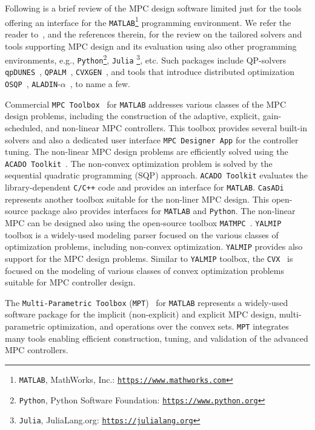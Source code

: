 \documentclass[letterpaper, 10 pt, conference]{ieeeconf}
\begin{document}
	Following is a brief review of the MPC design software limited just for the tools offering an interface for the \texttt{MATLAB}\footnote{\texttt{MATLAB}, MathWorks, Inc.: \texttt{\url{https://www.mathworks.com}}} programming environment. We refer the reader to~\cite{KF18,LT17,HS22}, 
	and the references therein, for the review on the tailored solvers and tools supporting MPC design and its evaluation using also other programming environments, e.g., \texttt{Python}\footnote{\texttt{Python}, Python Software Foundation: \texttt{\url{https://www.python.org}}}, \texttt{Julia} \footnote{\texttt{Julia}, JuliaLang.org: \texttt{\url{https://julialang.org}}}, etc. Such packages include QP-solvers \texttt{qpDUNES}~\cite{qpDUNES}, \texttt{QPALM}~\cite{QPALM}, \texttt{CVXGEN}~\cite{CVXGEN}, and tools that introduce distributed optimization \texttt{OSQP}~\cite{OSQP}, \texttt{ALADIN}-$\alpha$~\cite{EJ21}, to name a few. 
	
	Commercial \texttt{MPC Toolbox}~\cite{MPC_toolbox} for \texttt{MATLAB} addresses various classes of the MPC design problems, including the construction of the adaptive, explicit, gain-scheduled, and non-linear MPC controllers. This toolbox provides several built-in solvers and also a dedicated user interface \texttt{MPC Designer App} for the controller tuning. 
	The non-linear MPC design problems are efficiently solved using the \texttt{ACADO Toolkit}~\cite{ACADO_Toolkit}. The non-convex optimization problem is solved by the sequential quadratic programming (SQP) approach.  \texttt{ACADO Toolkit} evaluates the library-dependent \texttt{C/C++} code and provides an interface for \texttt{MATLAB}. 
	\texttt{CasADi}~\cite{CasADi} represents another toolbox suitable for the non-liner MPC design. This open-source package also provides interfaces for \texttt{MATLAB} and \texttt{Python}. 
	The non-linear MPC can be designed also using the open-source toolbox \texttt{MATMPC}~\cite{MATMPC}. 
	\texttt{YALMIP}~\cite{L04} toolbox is a widely-used modeling parser focused on the various classes of optimization problems, including non-convex optimization. \texttt{YALMIP} provides also support for the MPC design problems. 
	Similar to \texttt{YALMIP} toolbox, the \texttt{CVX}~\cite{GB08} is focused on the modeling of various classes of convex optimization problems suitable for MPC controller design. 
	
	The \texttt{Multi-Parametric Toolbox} (\texttt{MPT})~\cite{MPT3} for \texttt{MATLAB} represents a widely-used software package for the implicit (non-explicit) and explicit MPC design, multi-parametric optimization, and operations over the convex sets. \texttt{MPT} integrates many tools enabling efficient construction, tuning, and validation of the advanced MPC controllers. 
	
\end{document}
